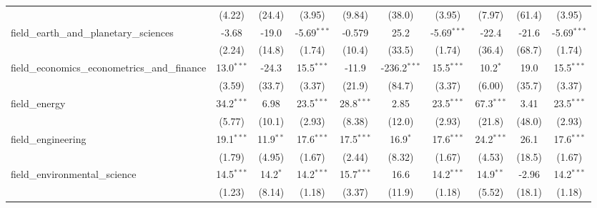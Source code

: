 \begin{tabular}{lccccccccc}
                                                               & (4.22)        & (24.4)        & (3.95)        & (9.84)        & (38.0)         & (3.95)        & (7.97)        & (61.4)         & (3.95)\\   
   field\_earth\_and\_planetary\_sciences                      & -3.68         & -19.0         & -5.69$^{***}$ & -0.579        & 25.2           & -5.69$^{***}$ & -22.4         & -21.6          & -5.69$^{***}$\\   
                                                               & (2.24)        & (14.8)        & (1.74)        & (10.4)        & (33.5)         & (1.74)        & (36.4)        & (68.7)         & (1.74)\\   
   field\_economics\_econometrics\_and\_finance                & 13.0$^{***}$  & -24.3         & 15.5$^{***}$  & -11.9         & -236.2$^{***}$ & 15.5$^{***}$  & 10.2$^{*}$    & 19.0           & 15.5$^{***}$\\   
                                                               & (3.59)        & (33.7)        & (3.37)        & (21.9)        & (84.7)         & (3.37)        & (6.00)        & (35.7)         & (3.37)\\   
   field\_energy                                               & 34.2$^{***}$  & 6.98          & 23.5$^{***}$  & 28.8$^{***}$  & 2.85           & 23.5$^{***}$  & 67.3$^{***}$  & 3.41           & 23.5$^{***}$\\   
                                                               & (5.77)        & (10.1)        & (2.93)        & (8.38)        & (12.0)         & (2.93)        & (21.8)        & (48.0)         & (2.93)\\   
   field\_engineering                                          & 19.1$^{***}$  & 11.9$^{**}$   & 17.6$^{***}$  & 17.5$^{***}$  & 16.9$^{*}$     & 17.6$^{***}$  & 24.2$^{***}$  & 26.1           & 17.6$^{***}$\\   
                                                               & (1.79)        & (4.95)        & (1.67)        & (2.44)        & (8.32)         & (1.67)        & (4.53)        & (18.5)         & (1.67)\\   
   field\_environmental\_science                               & 14.5$^{***}$  & 14.2$^{*}$    & 14.2$^{***}$  & 15.7$^{***}$  & 16.6           & 14.2$^{***}$  & 14.9$^{**}$   & -2.96          & 14.2$^{***}$\\   
                                                               & (1.23)        & (8.14)        & (1.18)        & (3.37)        & (11.9)         & (1.18)        & (5.52)        & (18.1)         & (1.18)\\   

\end{tabular}
